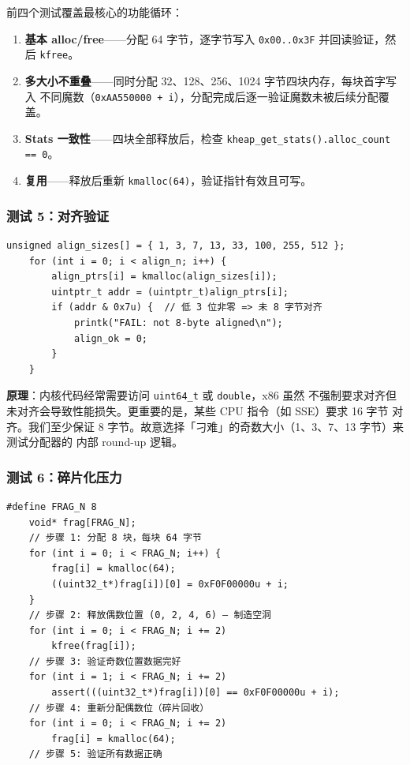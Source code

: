 前四个测试覆盖最核心的功能循环：

\begin{enumerate}
  \item \textbf{基本 alloc/free}——分配 64 字节，逐字节写入 \texttt{0x00..0x3F}
    并回读验证，然后 \texttt{kfree}。
  \item \textbf{多大小不重叠}——同时分配 32、128、256、1024 字节四块内存，每块首字写入
    不同魔数（\texttt{0xAA550000 + i}），分配完成后逐一验证魔数未被后续分配覆盖。
  \item \textbf{Stats 一致性}——四块全部释放后，检查 \texttt{kheap\_get\_stats().alloc\_count == 0}。
  \item \textbf{复用}——释放后重新 \texttt{kmalloc(64)}，验证指针有效且可写。
\end{enumerate}

\subsubsection{测试 5：对齐验证}

\begin{lstlisting}[style=cstyle]
    unsigned align_sizes[] = { 1, 3, 7, 13, 33, 100, 255, 512 };
    for (int i = 0; i < align_n; i++) {
        align_ptrs[i] = kmalloc(align_sizes[i]);
        uintptr_t addr = (uintptr_t)align_ptrs[i];
        if (addr & 0x7u) {  // 低 3 位非零 => 未 8 字节对齐
            printk("FAIL: not 8-byte aligned\n");
            align_ok = 0;
        }
    }
\end{lstlisting}

\textbf{原理}：内核代码经常需要访问 \texttt{uint64\_t} 或 \texttt{double}，x86 虽然
不强制要求对齐但未对齐会导致性能损失。更重要的是，某些 CPU 指令（如 SSE）要求 16 字节
对齐。我们至少保证 8 字节。故意选择「刁难」的奇数大小（1、3、7、13 字节）来测试分配器的
内部 round-up 逻辑。

\subsubsection{测试 6：碎片化压力}

\begin{lstlisting}[style=cstyle]
    #define FRAG_N 8
    void* frag[FRAG_N];
    // 步骤 1: 分配 8 块，每块 64 字节
    for (int i = 0; i < FRAG_N; i++) {
        frag[i] = kmalloc(64);
        ((uint32_t*)frag[i])[0] = 0xF0F00000u + i;
    }
    // 步骤 2: 释放偶数位置 (0, 2, 4, 6) — 制造空洞
    for (int i = 0; i < FRAG_N; i += 2)
        kfree(frag[i]);
    // 步骤 3: 验证奇数位置数据完好
    for (int i = 1; i < FRAG_N; i += 2)
        assert(((uint32_t*)frag[i])[0] == 0xF0F00000u + i);
    // 步骤 4: 重新分配偶数位（碎片回收）
    for (int i = 0; i < FRAG_N; i += 2)
        frag[i] = kmalloc(64);
    // 步骤 5: 验证所有数据正确
\end{lstlisting}

